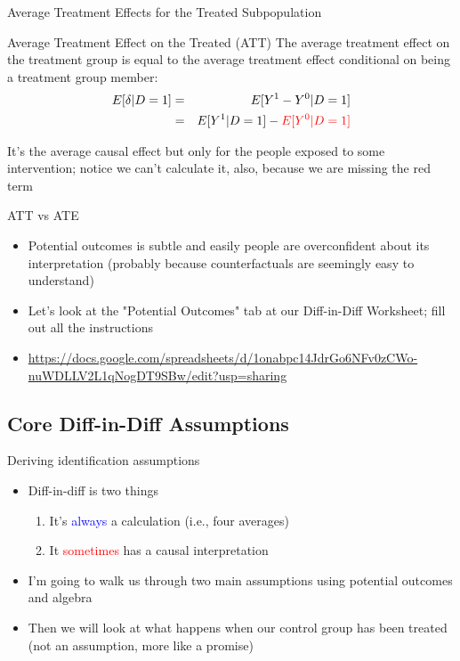 \documentclass{beamer}
\begin{document}
\begin{frame}{Average Treatment Effects for the Treated Subpopulation}
	\begin{block}{Average Treatment Effect on the Treated (ATT)}
	The average treatment effect on the treatment group is equal to the average treatment effect conditional on being a treatment group member:
		\begin{eqnarray*}
		E[\delta|D=1]&=&E[Y^1-Y^0|D=1] \nonumber \\
		&=&E[Y^1|D=1]-\textcolor{red}{E[Y^0|D=1]}
		\end{eqnarray*}
	\end{block}

	\bigskip

It's the average causal effect but only for the people exposed to some intervention; notice we can't calculate it, also, because we are missing the red term


\end{frame}

\begin{frame}{ATT vs ATE}

\begin{itemize}
\item Potential outcomes is subtle and easily people are overconfident about its interpretation (probably because counterfactuals are seemingly easy to understand)
\item Let's look at the "Potential Outcomes" tab at our Diff-in-Diff Worksheet; fill out all the instructions 
\item \url{https://docs.google.com/spreadsheets/d/1onabpc14JdrGo6NFv0zCWo-nuWDLLV2L1qNogDT9SBw/edit?usp=sharing}
\end{itemize}

\end{frame}




\subsection{Core Diff-in-Diff Assumptions}

\begin{frame}{Deriving identification assumptions}

\begin{itemize}

\item Diff-in-diff is two things
	\begin{enumerate}
	\item It's \textcolor{blue}{always} a calculation (i.e., four averages)
	\item It \textcolor{red}{sometimes} has a causal interpretation
	\end{enumerate}
\item I'm going to walk us through two main assumptions using potential outcomes and algebra
\item Then we will look at what happens when our control group has been treated (not an assumption, more like a promise)
\end{itemize}

\end{frame}
\end{document}
